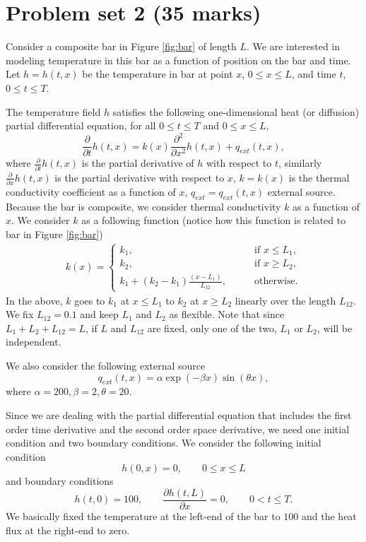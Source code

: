 \documentclass[11pt,a4paper]{article}
\newcommand{\p}{\partial }
\begin{document}
\section{Problem set 2 (35 marks)}
Consider a composite bar in Figure \ref{fig:bar} of length $L$. We are interested in modeling temperature in this bar as a function of position on the bar and time. Let $h = h(t, x)$ be the temperature in bar at point $x$, $0\leq x \leq L$, and time $t$, $0 \leq t \leq T$. 

The temperature field $h$ satisfies the following one-dimensional heat (or diffusion) partial differential equation, for all $0 \leq t \leq T$ and $0\leq x \leq L$,
\begin{equation}\label{eq:pde}
\frac{\p}{\p t} h(t, x) = k(x) \frac{\p^2 }{\p x^2} h(t, x) + q_{ext}(t, x),
\end{equation}
where $\frac{\p}{\p t} h(t, x)$ is the partial derivative of $h$ with respect to $t$, similarly $\frac{\p}{\p x} h(t, x)$ is the partial derivative with respect to $x$, $k = k(x)$ is the thermal conductivity coefficient as a function of $x$, $q_{ext} = q_{ext}(t, x)$ external source. Because the bar is composite, we consider thermal conductivity $k$ as a function of $x$. We consider $k$ as a following function (notice how this function is related to bar in Figure \ref{fig:bar})
\begin{align}\label{eq:cond}
k(x) = \begin{cases}
k_1, & \qquad \text{if } x \leq L_1, \\
k_2, & \qquad \text{if } x \geq L_2, \\
k_1 + (k_2 - k_1)\frac{(x - L_1)}{L_{12} }, &\qquad \text{otherwise}.
\end{cases}
\end{align}
In the above, $k$ goes to $k_1$ at $x \leq L_1$ to $k_2$ at $x \geq L_2$ linearly over the length $L_{12}$. We fix $L_{12} = 0.1$ and keep $L_1$ and $L_2$ as flexible. Note that since $L_1 + L_2 + L_{12} = L$, if $L$ and $L_{12}$ are fixed, only one of the two, $L_1$ or $L_2$, will be independent. 

We also consider the following external source
\begin{equation}\label{eq:qext}
q_{ext}(t, x) = \alpha \exp(-\beta x) \sin(\theta x),
\end{equation}
where $\alpha = 200, \beta = 2, \theta = 20$.

Since we are dealing with the partial differential equation that includes the first order time derivative and the second order space derivative, we need one initial condition and two boundary conditions. We consider the following initial condition
\begin{equation}\label{eq:pdeIC}
h(0, x) = 0, \qquad 0 \leq x \leq L
\end{equation}
and boundary conditions
\begin{equation}
h(t, 0) = 100, \qquad \frac{\p h(t, L)}{\p x} = 0, \qquad 0 < t \leq T.
\end{equation}
We basically fixed the temperature at the left-end of the bar to $100$ and the heat flux at the right-end to zero.
\end{document}
